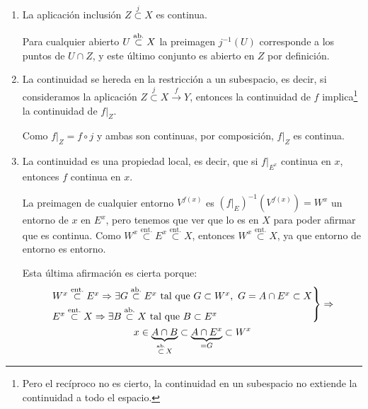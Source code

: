\begin{obs}
\begin{enumerate}
    \item La aplicación inclusión $Z \stackrel{j}{\subset} X$ es continua.
    \begin{demo}
     Para cualquier abierto $U \stackrel{\text{ab.}}{\subset} X$ la preimagen $j^{-1}\left( U \right)$ corresponde a los puntos de $U \cap Z$, y este último conjunto es abierto en $Z$ por definición.
    \end{demo}

    \item La continuidad se hereda en la restricción a un subespacio, es decir, si consideramos la aplicación $Z \stackrel{j}{\subset} X \xrightarrow{f} Y$, entonces la continuidad de $f$ implica\footnote{Pero el recíproco no es cierto, la continuidad en un subespacio no extiende la continuidad a todo el espacio.} la continuidad de $f|_Z$.
    \begin{demo}
    Como $f|_Z = f \circ j$ y ambas son continuas, por composición, $f|_Z$ es continua.
    \end{demo}

    \item La continuidad es una propiedad local, es decir, que si $f|_{E^x}$ continua en $x$, entonces $f$ continua en $x$.
    \begin{demo}
	La preimagen de cualquier entorno $V^{f\left( x \right)}$ es $\left( f|_{E} \right)^{-1} \left( V^{f\left( x \right)} \right) = W^x$ un entorno de $x$ en $E^x$, pero tenemos que ver que lo es en $X$ para poder afirmar que es continua.
	Como $W^x \stackrel{\text{ent.}}{\subset} E^x \stackrel{\text{ent.}}{\subset} X$, entonces $W^x \stackrel{\text{ent.}}{\subset}X$, ya que entorno de entorno es entorno.
	
	Esta última afirmación es cierta porque:
        \begin{gather*}
        \begin{rcases}
           	W^x \stackrel{\text{ent.}}{\subset} E^x \Rightarrow \exists G \stackrel{\text{ab.}}{\subset} E^x \mbox{ tal que }G \subset W^x, \ G = A \cap E^x \subset X\\ 
            E^x \stackrel{\text{ent.}}{\subset} X \Rightarrow \exists B \stackrel{\text{ab.}}{\subset} X \mbox{ tal que } B \subset E^x
        \end{rcases}\Rightarrow\\
        x \in \underbrace{A \cap B}_{\stackrel{\text{ab.}}{\subset} X} \subset \underbrace{A \cap E^x}_{= G}  \subset W^x
        \end{gather*}
    \end{demo}


\end{enumerate}
\end{obs}
